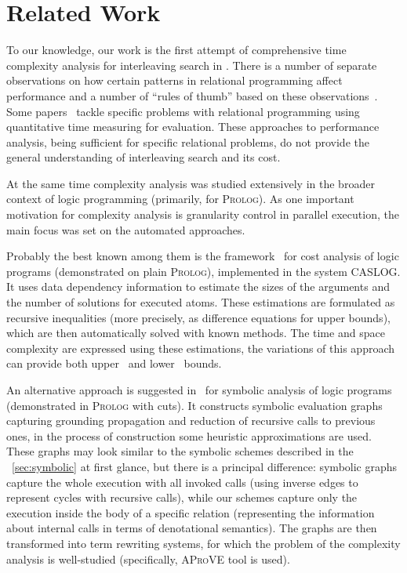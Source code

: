 \section{Related Work}
\label{sec:related}

To our knowledge, our work is the first attempt of comprehensive time complexity analysis for interleaving search in \mK.
There is a number of separate observations on how certain patterns in relational programming affect performance and a number
of ``rules of thumb'' based on these observations~\cite{WillsThesis}. Some papers~\cite{GuardedFresh, FloatArithmetics, UniversalQuantification} tackle
specific problems with relational programming using quantitative time measuring for evaluation. These approaches to performance analysis, being sufficient
for specific relational problems, do not provide the general understanding of interleaving search and its cost.

At the same time complexity analysis was studied extensively in the broader context of logic programming (primarily, for \textsc{Prolog}).
As one important motivation for complexity analysis is granularity control in parallel execution, the main focus was set on the automated approaches.

Probably the best known among them is the framework~\cite{CostAnalysisLP} for cost analysis of logic programs (demonstrated on plain \textsc{Prolog}),
implemented in the system \textsc{CASLOG}. It uses data dependency information to estimate the sizes of the arguments and the number of solutions for
executed atoms. These estimations are formulated as recursive inequalities (more precisely, as difference equations for upper bounds), which are then
automatically solved with known methods. The time and space complexity are expressed using these estimations, the variations of this approach can
provide both upper~\cite{CostAnalysisLP} and lower~\cite{CostAnalysisLPLower} bounds.

An alternative approach is suggested in~\cite{SymbolicAnalysisLP} for symbolic analysis of logic programs (demonstrated in \textsc{Prolog} with cuts).
It constructs symbolic evaluation graphs capturing grounding propagation and reduction of recursive calls to previous ones, in the process of construction
some heuristic approximations are used. These graphs may look similar to the symbolic schemes described in the \sectionword~\ref{sec:symbolic} at first glance,
but there is a principal difference: symbolic graphs capture the whole execution with all invoked calls (using inverse edges to represent cycles with recursive calls),
while our schemes capture only the execution inside the body of a specific relation (representing the information about internal calls in terms of denotational semantics).
The graphs are then transformed into term rewriting systems, for which the problem of the complexity analysis is well-studied (specifically, \textsc{AProVE} tool is used).

